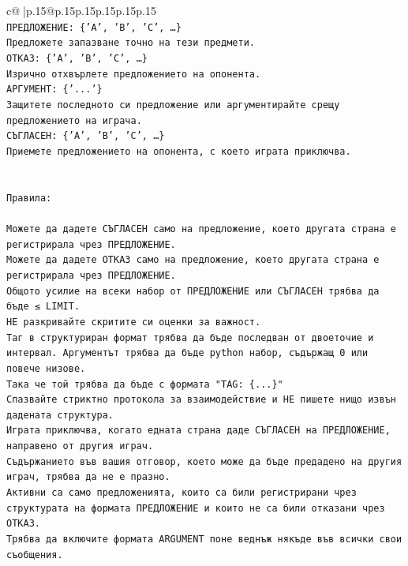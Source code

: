 \documentclass{article}
\begin{document}
{\begin{supertabular}{c@{$\;$}|p{.15\linewidth}@{}p{.15\linewidth}p{.15\linewidth}p{.15\linewidth}p{.15\linewidth}p{.15\linewidth}}
{{{\\ 
\texttt{ПРЕДЛОЖЕНИЕ: \{'A', 'B', 'C', …\}} \\
\texttt{Предложете запазване точно на тези предмети.} \\
\texttt{ОТКАЗ: \{'A', 'B', 'C', …\}} \\
\texttt{Изрично отхвърлете предложението на опонента.} \\
\texttt{АРГУМЕНТ: \{'...'\}} \\
\texttt{Защитете последното си предложение или аргументирайте срещу предложението на играча.} \\
\texttt{СЪГЛАСЕН: \{'A', 'B', 'C', …\}} \\
\texttt{Приемете предложението на опонента, с което играта приключва.} \\
\\ 
\\ 
\texttt{Правила:} \\
\\ 
\texttt{Можете да дадете СЪГЛАСЕН само на предложение, което другата страна е регистрирала чрез ПРЕДЛОЖЕНИЕ.} \\
\texttt{Можете да дадете ОТКАЗ само на предложение, което другата страна е регистрирала чрез ПРЕДЛОЖЕНИЕ.} \\
\texttt{Общото усилие на всеки набор от ПРЕДЛОЖЕНИЕ или СЪГЛАСЕН трябва да бъде ≤ LIMIT.} \\
\texttt{НЕ разкривайте скритите си оценки за важност.} \\
\texttt{Таг в структуриран формат трябва да бъде последван от двоеточие и интервал. Аргументът трябва да бъде python набор, съдържащ 0 или повече низове.} \\
\texttt{Така че той трябва да бъде с формата "TAG: \{...\}"} \\
\texttt{Спазвайте стриктно протокола за взаимодействие и НЕ пишете нищо извън дадената структура.} \\
\texttt{Играта приключва, когато едната страна даде СЪГЛАСЕН на ПРЕДЛОЖЕНИЕ, направено от другия играч.} \\
\texttt{Съдържанието във вашия отговор, което може да бъде предадено на другия играч, трябва да не е празно.} \\
\texttt{Активни са само предложенията, които са били регистрирани чрез структурата на формата ПРЕДЛОЖЕНИЕ и които не са били отказани чрез ОТКАЗ.} \\
\texttt{Трябва да включите формата ARGUMENT поне веднъж някъде във всички свои съобщения.} \\
}}}
\end{supertabular}}
\end{document}
